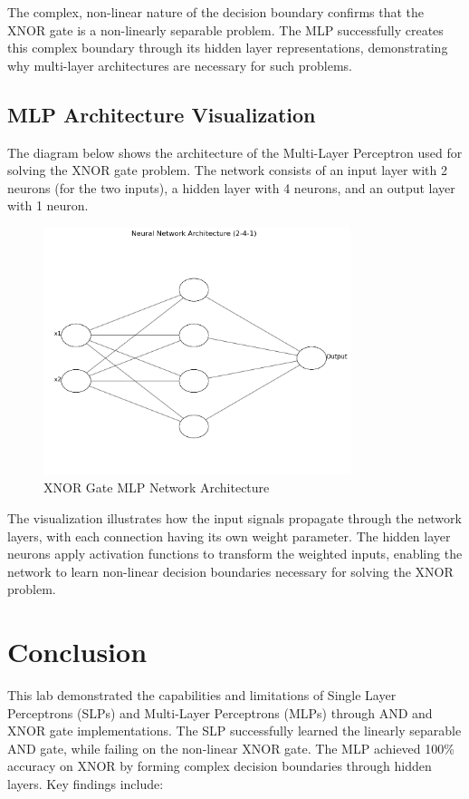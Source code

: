 \documentclass[12pt]{article}
\begin{document}
The complex, non-linear nature of the decision boundary confirms that the XNOR gate is a non-linearly separable problem. The MLP successfully creates this complex boundary through its hidden layer representations, demonstrating why multi-layer architectures are necessary for such problems.

\subsection*{MLP Architecture Visualization}
The diagram below shows the architecture of the Multi-Layer Perceptron used for solving the XNOR gate problem. The network consists of an input layer with 2 neurons (for the two inputs), a hidden layer with 4 neurons, and an output layer with 1 neuron.

\begin{figure}[H]
\centering
\includegraphics[width=0.8\textwidth]{xnor_neurons.png}
\caption{XNOR Gate MLP Network Architecture}
\end{figure}

The visualization illustrates how the input signals propagate through the network layers, with each connection having its own weight parameter. The hidden layer neurons apply activation functions to transform the weighted inputs, enabling the network to learn non-linear decision boundaries necessary for solving the XNOR problem.

\section*{Conclusion}
This lab demonstrated the capabilities and limitations of Single Layer Perceptrons (SLPs) and Multi-Layer Perceptrons (MLPs) through AND and XNOR gate implementations. The SLP successfully learned the linearly separable AND gate, while failing on the non-linear XNOR gate. The MLP achieved 100\% accuracy on XNOR by forming complex decision boundaries through hidden layers. Key findings include:
\end{document}
